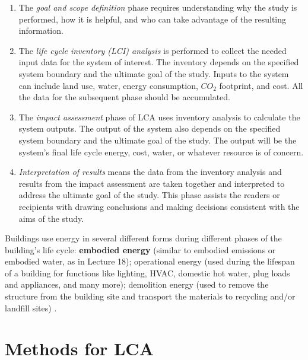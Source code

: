 \documentclass[10pt]{article}
\begin{document}
 \vspace{-6pt}
\begin{enumerate}

\item  The \textit{goal and scope definition} phase requires understanding why the study is performed, how it is helpful, and who can take advantage of the resulting information. 
 
\item The \textit{life cycle inventory (LCI) analysis} is performed to collect the needed input data for the system of interest. The inventory depends on the specified system boundary and the ultimate goal of the study. Inputs to the system can include land use, water, energy consumption, $CO_2$ footprint, and cost. All the data for the subsequent phase should be accumulated. 

\item The \textit{impact assessment} phase of LCA uses inventory analysis to calculate the system outputs. The output of the system also depends on the specified system boundary and the ultimate goal of the study. The output will be the system's final life cycle energy, cost, water, or whatever resource is of concern. 

\item \textit{Interpretation of results} means the data from the inventory analysis and results from the impact assessment are taken together and interpreted to address the ultimate goal of the study. This phase assists the readers or recipients with drawing conclusions and making decisions consistent with the aims of the study.
\end{enumerate}
\vspace{-6pt}


 {\color{blue}Buildings use energy in several different forms during different phases of the building's life cycle:}  \textbf{embodied energy} (similar to embodied emissions or embodied water, as in Lecture 18); operational energy (used during the lifespan of a building for functions like lighting, HVAC, domestic hot water, plug loads and appliances, and many more); demolition energy (used to remove the structure from the building site and transport the materials to recycling and/or landfill sites) \cite{cabeza2014life}.
 
\section{Methods for LCA} %
\end{document}
